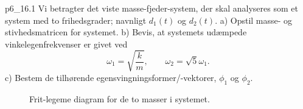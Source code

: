 
\begin{problemwithimage}{p6_1}{6.1}
  Vi betragter det viste masse-fjeder-system, der skal analyseres som et system med to frihedsgrader; navnligt $d_1(t)$ og $d_2(t)$.
  a) Opstil masse- og stivhedsmatricen for systemet.
  b) Bevis, at systemets udæmpede vinkelegenfrekvenser er givet ved
  \[ 
  \omega_1 = \sqrt{\frac{k}{m}}, \qquad \omega_2 = \sqrt{5}\omega_1
  .\]
  c) Bestem de tilhørende egensvingningsformer/-vektorer, $\phi_1$ og $\phi_2$.
\end{problemwithimage}

\begin{figure}[ht]
    \centering
    \caption{Frit-legeme diagram for de to masser i systemet.}
    \label{fig:p6_1-1}
\end{figure}


